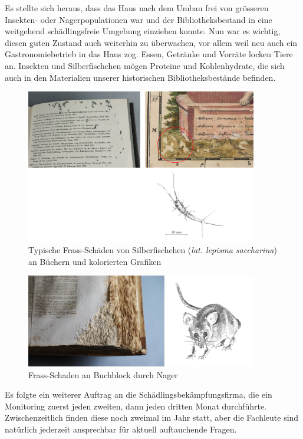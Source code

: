 \documentclass[a4paper,
fontsize=11pt,
oneside,
numbers=noperiodatend,
parskip=half-,
bibliography=totoc,
final
]{scrartcl}
\begin{document}
Es stellte sich heraus, dass das Haus nach dem Umbau frei von grösseren
Insekten- oder Nagerpopulationen war und der Bibliotheksbestand in eine
weitgehend schädlingsfreie Umgebung einziehen konnte. Nun war es
wichtig, diesen guten Zustand auch weiterhin zu überwachen, vor allem
weil neu auch ein Gastronomiebetrieb in das Haus zog. Essen, Getränke
und Vorräte locken Tiere an. Insekten und Silberfischchen mögen Proteine
und Kohlenhydrate, die sich auch in den Materialien unserer historischen
Bibliotheksbestände befinden.

\begin{figure}[h!]
\centering
\includegraphics[width=0.9\textwidth]{img/image1.png}
\caption{ Typische Frass-Schäden von Silberfischchen (\emph{lat. lepisma saccharina}) an Büchern und kolorierten Grafiken}
\end{figure}

\begin{figure}[h!]
\centering
\includegraphics[width=0.9\textwidth]{img/image2.png}
\caption{ Frass-Schaden an Buchblock durch Nager}
\end{figure}

Es folgte ein weiterer Auftrag an die Schädlingsbekämpfungsfirma, die
ein Monitoring zuerst jeden zweiten, dann jeden dritten Monat
durchführte. Zwischenzeitlich finden diese noch zweimal im Jahr statt,
aber die Fachleute sind natürlich jederzeit ansprechbar für aktuell
auftauchende Fragen.
\end{document}
